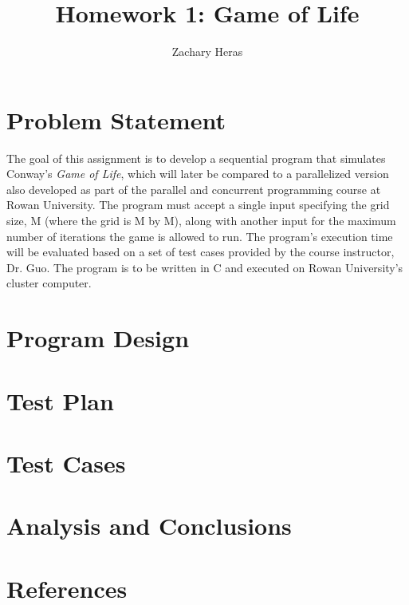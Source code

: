 \documentclass{article}
\title{Homework 1: Game of Life}
\author{Zachary Heras}
\begin{document}
	\maketitle
	
	\section{Problem Statement}
	The goal of this assignment is to develop a sequential program that simulates Conway's \textit{Game of Life}, which will later be compared to a parallelized version also developed as part of the parallel and concurrent programming course at Rowan University. The program must accept a single input specifying the grid size, M (where the grid is M by M), along with another input for the maximum number of iterations the game is allowed to run. The program's execution time will be evaluated based on a set of test cases provided by the course instructor, Dr. Guo. The program is to be written in C and executed on Rowan University's cluster computer.
	
	\section{Program Design}
	\section{Test Plan}
	\section{Test Cases}
	\section{Analysis and Conclusions}
	\section{References}
\end{document}
